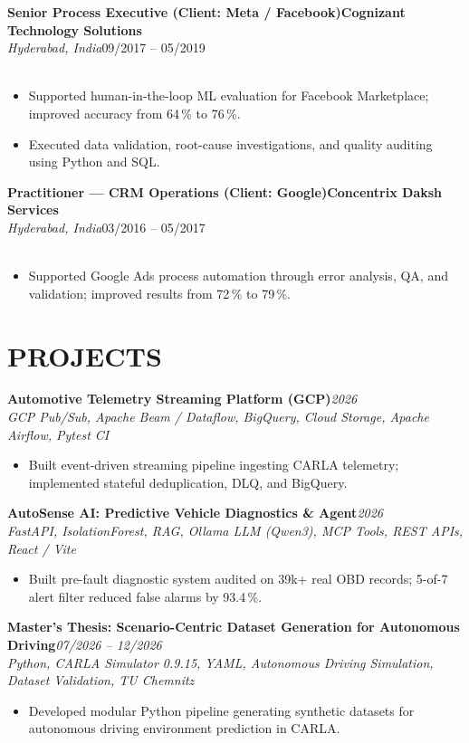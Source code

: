 \documentclass[9.6pt,a4paper]{article}
\newcommand{\experienceitem}[5]{%
  \textbf{#1}\hfill\textbf{#2}\\[-0.03em]
  {\small\textit{#3}}\hfill{\small #4}\\[-0.02em]
  \if\relax\detokenize{#5}\relax\else{\small\textit{#5}}\\[-0.42em]\fi
}
\newcommand{\compactliststart}{%
  \begin{itemize}[leftmargin=1.15em,labelsep=0.38em,topsep=0pt,itemsep=0.01em,parsep=0pt,partopsep=0pt]
}
\newcommand{\compactlistend}{\end{itemize}}
\begin{document}
\vspace{0.02em}
\experienceitem{Senior Process Executive (Client: Meta / Facebook)}{Cognizant Technology Solutions}{Hyderabad, India}{09/2017 -- 05/2019}{}
\compactliststart
  \item Supported human-in-the-loop ML evaluation for Facebook Marketplace; improved accuracy from 64\,\% to 76\,\%.
  \item Executed data validation, root-cause investigations, and quality auditing using Python and SQL.
\compactlistend

\vspace{0.02em}
\experienceitem{Practitioner — CRM Operations (Client: Google)}{Concentrix Daksh Services}{Hyderabad, India}{03/2016 -- 05/2017}{}
\compactliststart
  \item Supported Google Ads process automation through error analysis, QA, and validation; improved results from 72\,\% to 79\,\%.
\compactlistend

\section{PROJECTS}

\textbf{Automotive Telemetry Streaming Platform (GCP)}\hfill{\small\textit{2026}}\\[-0.03em]
{\small\textit{GCP Pub/Sub, Apache Beam / Dataflow, BigQuery, Cloud Storage, Apache Airflow, Pytest CI}}\\[-0.42em]
\compactliststart
  \item Built event-driven streaming pipeline ingesting CARLA telemetry; implemented stateful deduplication, DLQ, and BigQuery.
\compactlistend

\vspace{0.02em}
\textbf{AutoSense AI: Predictive Vehicle Diagnostics \& Agent}\hfill{\small\textit{2026}}\\[-0.03em]
{\small\textit{FastAPI, IsolationForest, RAG, Ollama LLM (Qwen3), MCP Tools, REST APIs, React / Vite}}\\[-0.42em]
\compactliststart
  \item Built pre-fault diagnostic system audited on 39k+ real OBD records; 5-of-7 alert filter reduced false alarms by 93.4\,\%.
\compactlistend

\vspace{0.02em}
\textbf{Master's Thesis: Scenario-Centric Dataset Generation for Autonomous Driving}\hfill{\small\textit{07/2026 -- 12/2026}}\\[-0.03em]
{\small\textit{Python, CARLA Simulator 0.9.15, YAML, Autonomous Driving Simulation, Dataset Validation, TU Chemnitz}}\\[-0.42em]
\compactliststart
  \item Developed modular Python pipeline generating synthetic datasets for autonomous driving environment prediction in CARLA.
\compactlistend
\end{document}
